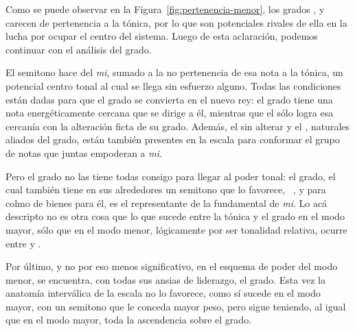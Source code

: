 \documentclass[a4paper,11pt]{article}
\begin{document}
\begin{multicols}{2}
    Como se puede observar en la Figura~\ref{fig:pertenencia-menor}, los grados ,  y  carecen de pertenencia a la tónica, por lo que son potenciales rivales de ella en la lucha por ocupar el centro del sistema. Luego de esta aclaración, podemos continuar con el análisis del  grado.

    El semitono  hace del \emph{mi\bemoltxt}, sumado a la no pertenencia de esa nota a la tónica, un potencial centro tonal al cual se llega sin esfuerzo alguno. Todas las condiciones están dadas para que el  grado se convierta en el nuevo rey: el  grado tiene una nota energéticamente cercana que se dirige a él, mientras que el  sólo logra esa cercanía con la alteración ficta de su  grado. Además, el  sin alterar y el , naturales aliados del  grado, están también presentes en la escala para conformar el grupo de notas  que juntas empoderan a \emph{mi\bemoltxt}.

    Pero el  grado no las tiene todas consigo para llegar al poder tonal: el  grado, el cual también tiene en sus alrededores un semitono que lo favorece, \hbox{ ,} y para colmo de bienes para él, es el representante de la fundamental de \emph{mi\bemoltxt}. Lo acá descripto no es otra cosa que lo que sucede entre la tónica y el  grado en el modo mayor, sólo que en el modo menor, lógicamente por ser tonalidad relativa, ocurre entre  y .

    Por último, y no por eso menos significativo, en el esquema de poder del modo menor, se encuentra, con todas sus ansias de liderazgo, el  grado. Esta vez la anatomía interválica de la escala no lo favorece, como sí sucede en el modo mayor, con un semitono que le conceda mayor peso, pero sigue teniendo, al igual que en el modo mayor, toda la ascendencia sobre el  grado.
\end{multicols}
\end{document}
